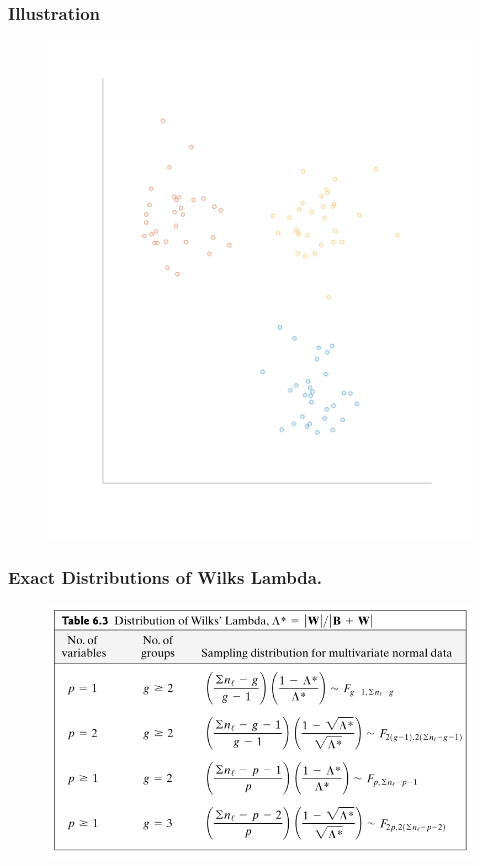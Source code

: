 \documentclass[aspectratio=169,10pt,t]{beamer}
\begin{document}
\begin{frame}[t]
	\frametitle{Illustration}
	\begin{figure}[H]
		\includegraphics[scale=0.28]{clusters.png}
	\end{figure} 
\end{frame}
\begin{frame}[t]
	\frametitle{Exact Distributions of Wilks Lambda.}

	\begin{figure}[H]
		\centering
		\includegraphics[scale=0.3]{images/1.png}
	\end{figure}
\end{frame}
\end{document}
